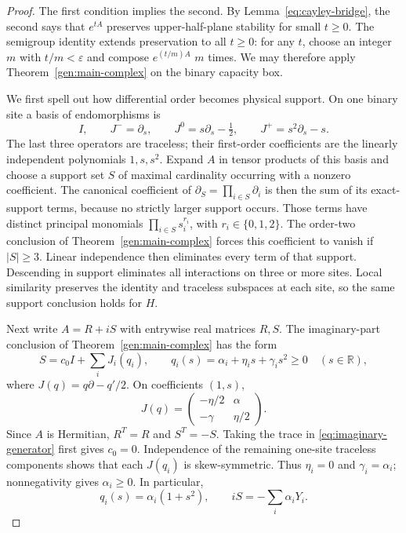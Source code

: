 \documentclass[reqno]{amsart}
\theoremstyle{definition}
\theoremstyle{remark}
\newcommand{\R}{\mathbb R}
\begin{document}
\begin{proof}
The first condition implies the second.  By
Lemma~\ref{eq:cayley-bridge}, the second says that \(e^{tA}\)
preserves upper-half-plane stability for small \(t\ge0\).
The semigroup identity extends preservation to all \(t\ge0\):
for any \(t\), choose an integer \(m\) with \(t/m<\varepsilon\)
and compose \(e^{(t/m)A}\) \(m\) times.  We may therefore apply
Theorem~\ref{gen:main-complex} on the binary capacity box.

We first spell out how differential order becomes physical support.
On one binary site a basis of endomorphisms is
\[
 I,\qquad J^- =\partial_s,\qquad
 J^0=s\partial_s-\tfrac12,\qquad
 J^+=s^2\partial_s-s.
\]
The last three operators are traceless; their first-order coefficients
are the linearly independent polynomials \(1,s,s^2\).
Expand \(A\) in tensor products of this basis and choose a support
set \(S\) of maximal cardinality occurring with a nonzero coefficient.
The canonical coefficient of \(\partial_S=\prod_{i\in S}\partial_i\)
is then the sum of its exact-support terms, because no strictly larger
support occurs.  Those terms have distinct principal monomials
\(\prod_{i\in S}s_i^{r_i}\), with \(r_i\in\{0,1,2\}\).
The order-two conclusion of Theorem~\ref{gen:main-complex} forces
this coefficient to vanish if \(|S|\ge3\).  Linear independence
then eliminates every term of that support.  Descending in support
eliminates all interactions on three or more sites.  Local similarity
preserves the identity and traceless subspaces at each site, so the
same support conclusion holds for \(H\).

Next write \(A=R+iS\) with entrywise real matrices \(R,S\).
The imaginary-part conclusion of Theorem~\ref{gen:main-complex}
has the form
\begin{equation}\label{eq:imaginary-generator}
 S=c_0I+\sum_iJ_i(q_i),\qquad
 q_i(s)=\alpha_i+\eta_i s+\gamma_i s^2\ge0\quad(s\in\R),
\end{equation}
where \(J(q)=q\partial-q'/2\).  On coefficients \((1,s)\),
\[
 J(q)=\begin{pmatrix}-\eta/2&\alpha\\-\gamma&\eta/2\end{pmatrix}.
\]
Since \(A\) is Hermitian, \(R^T=R\) and \(S^T=-S\).
Taking the trace in \eqref{eq:imaginary-generator} first gives
\(c_0=0\).  Independence of the remaining one-site traceless
components shows that each \(J(q_i)\) is skew-symmetric.  Thus
\(\eta_i=0\) and \(\gamma_i=\alpha_i\); nonnegativity gives
\(\alpha_i\ge0\).  In particular,
\begin{equation}\label{eq:imaginary-local}
 q_i(s)=\alpha_i(1+s^2),\qquad
 iS=-\sum_i\alpha_iY_i.
\end{equation}


\end{proof}
\end{document}
